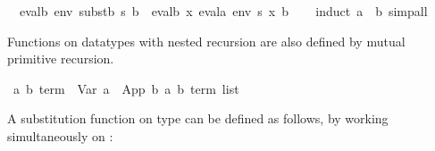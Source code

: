 \begin{isabellebody}
\ \ {}evalb\ env\ {}substb\ s\ b{}\ {}\ evalb\ {}{}x{}\ evala\ env\ {}s\ x{}{}\ b{}\isanewline
%
\isadelimproof
\ \ %
\endisadelimproof
%
\isatagproof
{}\isamarkupfalse%
\ {}induct\ a\ \ b{}\ simp{}all%
\endisatagproof
{\isafoldproof}%
%
\isadelimproof
%
\endisadelimproof
%
\isamarkuptrue%
%
\begin{isamarkuptext}%
Functions on datatypes with nested recursion are also defined
  by mutual primitive recursion.%
\end{isamarkuptext}%
\isamarkuptrue%
\isamarkupfalse%
\ {}{}a{}\ {}b{}\ {}term{}\ {}\ Var\ {}a\ {}\ App\ {}b\ {}{}{}a{}\ {}b{}\ term\ list{}%
\begin{isamarkuptext}%
A substitution function on type  can be
  defined as follows, by working simultaneously on :%
\end{isamarkuptext}%
\isamarkuptrue%

\end{isabellebody}
